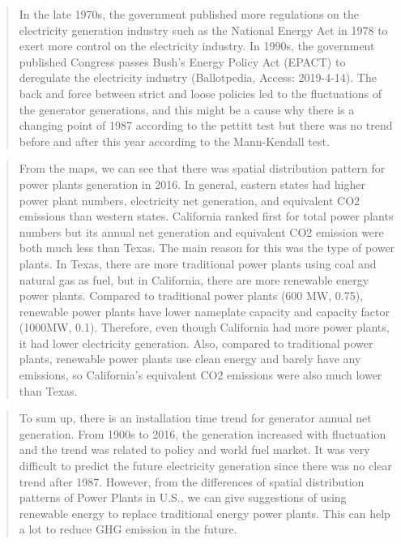 \documentclass[12pt,]{article}
\begin{document}
\begin{quote}
In the late 1970s, the government published more regulations on the
electricity generation industry such as the National Energy Act in 1978
to exert more control on the electricity industry. In 1990s, the
government published Congress passes Bush's Energy Policy Act (EPACT) to
deregulate the electricity industry (Ballotpedia, Access: 2019-4-14).
The back and force between strict and loose policies led to the
fluctuations of the generator generations, and this might be a cause why
there is a changing point of 1987 according to the pettitt test but
there was no trend before and after this year according to the
Mann-Kendall test.
\end{quote}

\begin{quote}
From the maps, we can see that there was spatial distribution pattern
for power plants generation in 2016. In general, eastern states had
higher power plant numbers, electricity net generation, and equivalent
CO2 emissions than western states. California ranked first for total
power plants numbers but its annual net generation and equivalent CO2
emission were both much less than Texas. The main reason for this was
the type of power plants. In Texas, there are more traditional power
plants using coal and natural gas as fuel, but in California, there are
more renewable energy power plants. Compared to traditional power plants
(600 MW, 0.75), renewable power plants have lower nameplate capacity and
capacity factor (1000MW, 0.1). Therefore, even though California had
more power plants, it had lower electricity generation. Also, compared
to traditional power plants, renewable power plants use clean energy and
barely have any emissions, so California's equivalent CO2 emissions were
also much lower than Texas.
\end{quote}

\begin{quote}
To sum up, there is an installation time trend for generator annual net
generation. From 1900s to 2016, the generation increased with
fluctuation and the trend was related to policy and world fuel market.
It was very difficult to predict the future electricity generation since
there was no clear trend after 1987. However, from the differences of
spatial distribution patterns of Power Plants in U.S., we can give
suggestions of using renewable energy to replace traditional energy
power plants. This can help a lot to reduce GHG emission in the future.
\end{quote}
\end{document}

